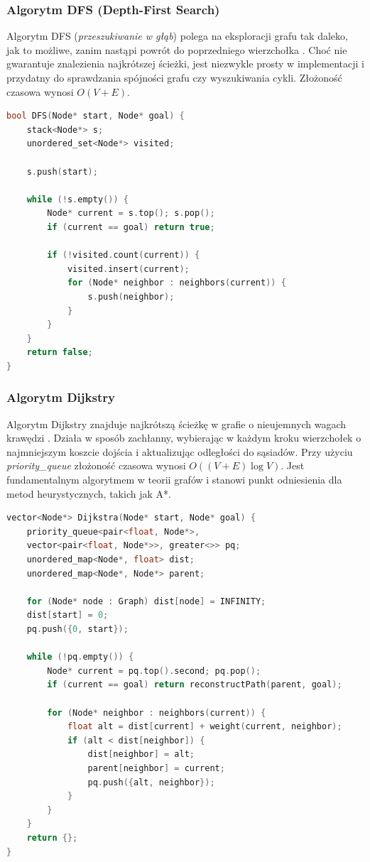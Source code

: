\documentclass[a4paper,12pt]{book} %
\begin{document}
\subsubsection*{Algorytm DFS (Depth-First Search)}
Algorytm DFS (\textit{przeszukiwanie w głąb}) polega na eksploracji grafu tak daleko, jak to możliwe, zanim nastąpi powrót do poprzedniego wierzchołka \cite{Algorithms_introduction}. 
Choć nie gwarantuje znalezienia najkrótszej ścieżki, jest niezwykle prosty w implementacji i przydatny do sprawdzania spójności grafu czy wyszukiwania cykli. Złożoność czasowa wynosi \(O(V + E)\).

\begin{lstlisting}[language=C++, caption={Przykład algorytmu DFS}, label={lst:dfs}]
bool DFS(Node* start, Node* goal) {
    stack<Node*> s;
    unordered_set<Node*> visited;

    s.push(start);

    while (!s.empty()) {
        Node* current = s.top(); s.pop();
        if (current == goal) return true;

        if (!visited.count(current)) {
            visited.insert(current);
            for (Node* neighbor : neighbors(current)) {
                s.push(neighbor);
            }
        }
    }
    return false;
}
\end{lstlisting}

\subsubsection*{Algorytm Dijkstry}
Algorytm Dijkstry znajduje najkrótszą ścieżkę w grafie o nieujemnych wagach krawędzi \cite{Algorithms_introduction}. 
Działa w sposób zachłanny, wybierając w każdym kroku wierzchołek o najmniejszym koszcie dojścia i aktualizując odległości do sąsiadów. Przy użyciu \textit{priority\_queue} złożoność czasowa wynosi \(O((V + E)\log V)\).
Jest fundamentalnym algorytmem w teorii grafów i stanowi punkt odniesienia dla metod heurystycznych, takich jak A*.

\begin{lstlisting}[language=C++, caption={Przykład algorytmu Dijkstry}, label={lst:dijkstra}]
vector<Node*> Dijkstra(Node* start, Node* goal) {
    priority_queue<pair<float, Node*>, 
    vector<pair<float, Node*>>, greater<>> pq;
    unordered_map<Node*, float> dist;
    unordered_map<Node*, Node*> parent;

    for (Node* node : Graph) dist[node] = INFINITY;
    dist[start] = 0;
    pq.push({0, start});

    while (!pq.empty()) {
        Node* current = pq.top().second; pq.pop();
        if (current == goal) return reconstructPath(parent, goal);

        for (Node* neighbor : neighbors(current)) {
            float alt = dist[current] + weight(current, neighbor);
            if (alt < dist[neighbor]) {
                dist[neighbor] = alt;
                parent[neighbor] = current;
                pq.push({alt, neighbor});
            }
        }
    }
    return {};
}
\end{lstlisting}
\end{document}
